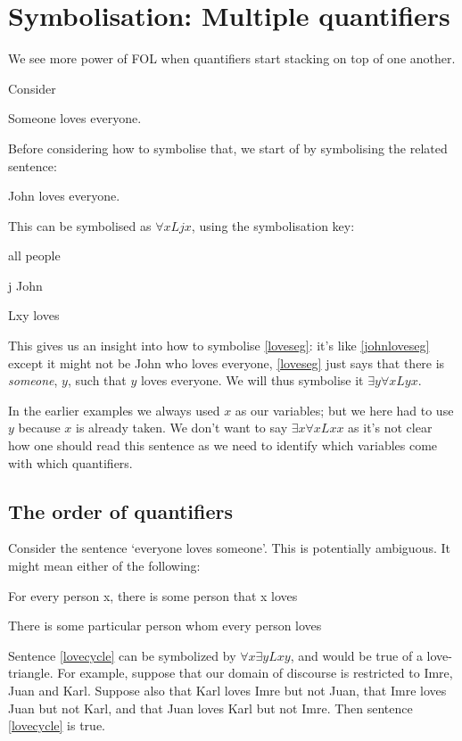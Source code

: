 \chapter{Symbolisation: Multiple quantifiers}\label{s:MultipleGenerality}



We see more power of FOL when quantifiers start stacking on top of one another.

Consider \begin{earg}
\item[\ex{loveseg}] Someone loves everyone.
\end{earg}
Before considering how to symbolise that, we start of by symbolising the related sentence:
\begin{earg}
\item[\ex{johnloveseg}] John loves everyone.
\end{earg} This can be symbolised
as $\forall x Ljx$, using the symbolisation key:\begin{ekey}
\item[\text{domain}] all people
\item[j] John
\item[Lxy]  loves 
\end{ekey}
This gives us an insight into how to symbolise \ref{loveseg}: it's like \ref{johnloveseg} except it might not be John who loves everyone, \ref{loveseg} just says that there is \emph{someone}, $y$, such that $y$ loves everyone. We will thus symbolise it $\exists y\forall x Lyx$.

In the earlier examples we always used $x$ as our variables; but we here had to use $y$ because $x$ is already taken. We don't want to say $\exists x\forall xLxx$ as it's not clear how one should read this sentence as we need to identify which variables come with which quantifiers.


\section{The order of quantifiers}
Consider the sentence `everyone loves someone'. This is potentially ambiguous. It might mean either of the following:
	\begin{earg}
		\item[\ex{lovecycle}] For every person x, there is some person that x loves
		\item[\ex{loveconverge}] There is some particular person whom every person loves
	\end{earg}
Sentence \ref{lovecycle} can be symbolized by $\forall x \exists y Lxy$, and would be true of a love-triangle. For example, suppose that our domain of discourse is restricted to Imre, Juan and Karl. Suppose also that Karl loves Imre but not Juan, that Imre loves Juan but not Karl, and that Juan loves Karl but not Imre. Then sentence \ref{lovecycle} is true.

